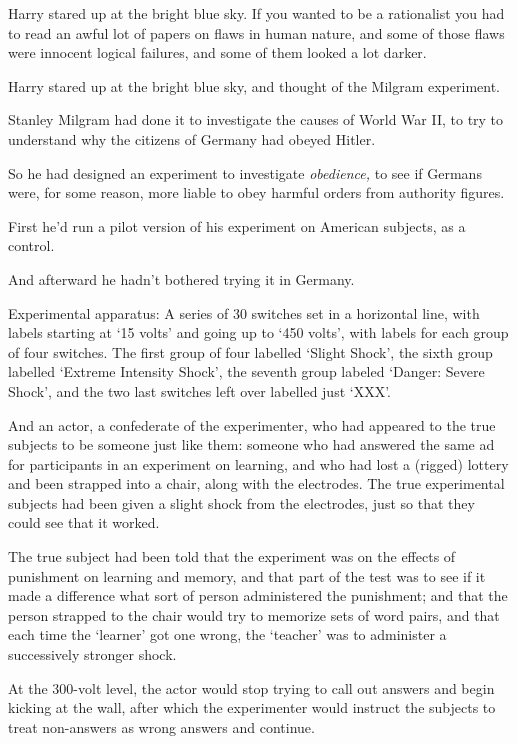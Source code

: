 Harry stared up at the bright blue sky. If you wanted to be a rationalist you
had to read an awful lot of papers on flaws in human nature, and some of those
flaws were innocent logical failures, and some of them looked a lot darker.

Harry stared up at the bright blue sky, and thought of the Milgram experiment.

Stanley Milgram had done it to investigate the causes of World War II, to try
to understand why the citizens of Germany had obeyed Hitler.

So he had designed an experiment to investigate \emph{obedience,} to see if
Germans were, for some reason, more liable to obey harmful orders from
authority figures.

First he'd run a pilot version of his experiment on American subjects, as a
control.

And afterward he hadn't bothered trying it in Germany.

Experimental apparatus: A series of 30 switches set in a horizontal line, with
labels starting at `15 volts' and going up to `450 volts', with labels for each
group of four switches. The first group of four labelled `Slight Shock', the
sixth group labelled `Extreme Intensity Shock', the seventh group labeled
`Danger: Severe Shock', and the two last switches left over labelled just `XXX'.

And an actor, a confederate of the experimenter, who had appeared to the true
subjects to be someone just like them: someone who had answered the same ad for
participants in an experiment on learning, and who had lost a (rigged) lottery
and been strapped into a chair, along with the electrodes. The true
experimental subjects had been given a slight shock from the electrodes, just
so that they could see that it worked.

The true subject had been told that the experiment was on the effects of
punishment on learning and memory, and that part of the test was to see if it
made a difference what sort of person administered the punishment; and that the
person strapped to the chair would try to memorize sets of word pairs, and that
each time the `learner' got one wrong, the `teacher' was to administer a
successively stronger shock.

At the 300-volt level, the actor would stop trying to call out answers and
begin kicking at the wall, after which the experimenter would instruct the
subjects to treat non-answers as wrong answers and continue.

